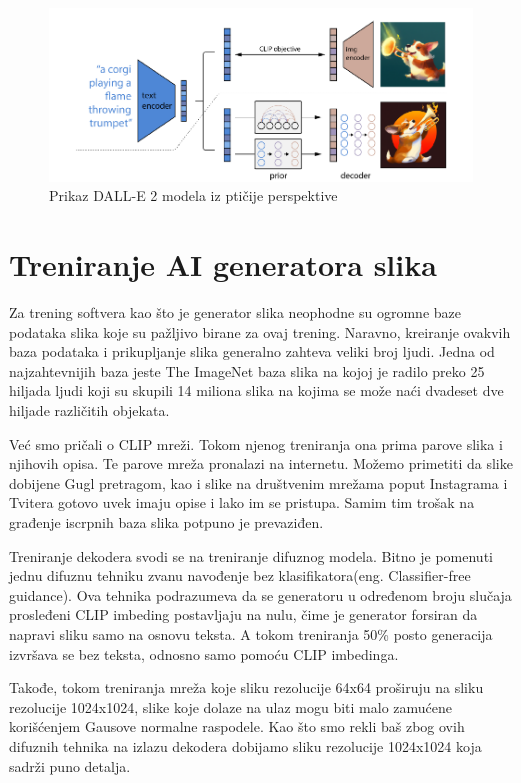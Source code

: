 \documentclass[12pt, letterpaper]{article}
\begin{document}
\begin{figure}[htp]
\centering
\includegraphics[width=1\textwidth]{dalle2.png}
\caption{Prikaz DALL-E 2 modela iz ptičije perspektive}
\label{fig: dalle2slika}
\end{figure}

\section{Treniranje AI generatora slika}

Za trening softvera kao što je generator slika neophodne su ogromne baze podataka slika koje su pažljivo birane za ovaj trening. Naravno, kreiranje ovakvih baza podataka i prikupljanje slika generalno zahteva veliki broj ljudi. Jedna od najzahtevnijih baza jeste The ImageNet baza slika na kojoj je radilo preko 25 hiljada ljudi koji su skupili 14 miliona slika na kojima se može naći dvadeset dve hiljade različitih objekata\cite{clip}. 

Već smo pričali o CLIP mreži. Tokom njenog treniranja ona prima parove slika i njihovih opisa. Te parove mreža pronalazi na internetu. Možemo primetiti da slike dobijene Gugl pretragom, kao i slike na društvenim mrežama poput Instagrama i Tvitera gotovo uvek imaju opise i lako im se pristupa. Samim tim trošak na građenje iscrpnih baza slika potpuno je prevaziđen.

Treniranje dekodera svodi se na treniranje difuznog modela. Bitno je pomenuti jednu difuznu tehniku zvanu navođenje bez klasifikatora(eng. Classifier-free guidance). Ova tehnika podrazumeva da se generatoru u određenom broju slučaja prosleđeni CLIP imbeding postavljaju na nulu, čime je generator forsiran da napravi sliku samo na osnovu teksta. A tokom treniranja 50\% posto generacija izvršava se bez teksta, odnosno samo pomoću CLIP imbedinga\cite{openai_dali}.

Takođe, tokom treniranja mreža koje sliku rezolucije 64x64 proširuju na sliku rezolucije 1024x1024, slike koje dolaze na ulaz mogu biti malo zamućene korišćenjem Gausove normalne raspodele. Kao što smo rekli baš zbog ovih difuznih tehnika na izlazu dekodera dobijamo sliku rezolucije 1024x1024 koja sadrži puno detalja.
\end{document}
